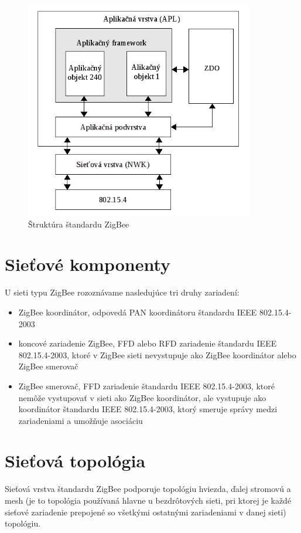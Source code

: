 \documentclass[11pt,twoside,a4paper]{book}
\begin{document}
\begin{figure}[h]
 \centering
 \includegraphics[width=10cm]{./figures/ZigBeeLayers.png}
 \caption{Štruktúra štandardu ZigBee}
 \label{fig:ZigBeeLayers}
\end{figure}

\section{Sieťové komponenty}
U sieti typu ZigBee rozoznávame nasledujúce tri druhy zariadení:
\begin{itemize}
\item ZigBee koordinátor, odpovedá PAN koordinátoru štandardu IEEE 802.15.4-2003
\item koncové zariadenie ZigBee, FFD alebo RFD zariadenie štandardu IEEE 802.15.4-2003, ktoré v ZigBee sieti nevystupuje ako ZigBee koordinátor alebo ZigBee smerovač
\item ZigBee smerovač, FFD zariadenie štandardu IEEE 802.15.4-2003, ktoré nemôže vystupovať v sieti ako ZigBee koordinátor, ale vystupuje ako koordinátor štandardu IEEE 802.15.4-2003, ktorý smeruje správy medzi zariadeniami a umožňuje asociáciu
\end{itemize}

\section{Sieťová topológia}
Sieťová vrstva štandardu ZigBee podporuje topológiu hviezda, ďalej stromovú a mesh (je to topológia používaná hlavne u bezdrôtových sieti, pri ktorej je každé sieťové zariadenie prepojené so všetkými ostatnými zariadeniami v danej sieti) topológiu.
\end{document}

